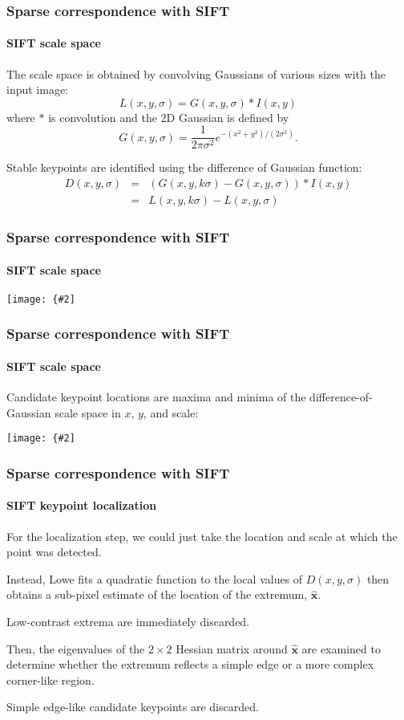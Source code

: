 \documentclass[aspectratio=169]{beamer}
\renewcommand{\vec}[1]{\boldsymbol{#1}}
\newcommand{\myfig}[3]{\centerline{\texttt{[image: \{\#2]}}}
    \centerline{\scriptsize #3}}
\begin{document}
\begin{frame}
\frametitle{Sparse correspondence with SIFT}
\framesubtitle{SIFT scale space}

The scale space is obtained by convolving Gaussians of various sizes
with the input image:
\begin{equation*}
L(x,y,\sigma)=G(x,y,\sigma) * I(x,y)
\end{equation*}
where $*$ is convolution and the 2D Gaussian is defined by
\begin{equation*}
G(x,y,\sigma)=\frac{1}{2\pi\sigma^2}e^{-(x^2+y^2)/(2\sigma^2)}.
\end{equation*}

\alert{Stable keypoints} are identified using the \alert{difference of
  Gaussian} function:
\begin{eqnarray*}
D(x,y,\sigma) & = & (G(x,y,k\sigma)-G(x,y,\sigma)) * I(x,y) \nonumber \\
& = & L(x,y,k\sigma) - L(x,y,\sigma)
\end{eqnarray*}

\end{frame}


\begin{frame}
\frametitle{Sparse correspondence with SIFT}
\framesubtitle{SIFT scale space}

\myfig{3in}{SIFT-fig1}{Lowe (2004), Fig.\ 1}

\end{frame}

\begin{frame}
\frametitle{Sparse correspondence with SIFT}
\framesubtitle{SIFT scale space}

Candidate keypoint locations are maxima and minima of the
difference-of-Gaussian scale space in $x$, $y$, \alert{and scale}:

\medskip

\myfig{2in}{SIFT-fig2}{Lowe (2004), Fig.\ 2}

\end{frame}

\begin{frame}
\frametitle{Sparse correspondence with SIFT}
\framesubtitle{SIFT keypoint localization}

For the localization step, we could just take the location and scale
at which the point was detected.

\medskip

Instead, Lowe fits a quadratic function to the local values of
$D(x,y,\sigma)$ then obtains a \alert{sub-pixel estimate} of the
location of the extremum, $\hat{\vec{x}}$.

\medskip

\alert{Low-contrast} extrema are immediately \alert{discarded}.

\medskip

Then, the eigenvalues of the $2\times 2$ Hessian matrix around
$\hat{\vec{x}}$ are examined to determine whether the extremum
reflects a \alert{simple edge} or a more complex \alert{corner-like}
region.

\medskip

Simple edge-like candidate keypoints are discarded.

\end{frame}
\end{document}

